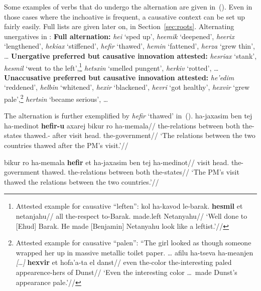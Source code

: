 Some examples of verbs that do undergo the alternation are given in~(\nextx). Even in those cases where the inchoative is frequent, a causative context can be set up fairly easily. Full lists are given later on, in Section~\ref{sec:roots}.
\pex\label{ex:thif-alt}Alternating unergatives in \thif:
	\a \textbf{Full alternation:} \emph{hei{\texttslig}} `sped up', \emph{heemik} `deepened', \emph{heerix} `lengthened', \emph{hekiax} `stiffened', \emph{hefir} `thawed', \emph{hemin} `fattened', \emph{herza} `grew thin', \dots
	\a \textbf{Unergative preferred but causative innovation attested:} \emph{hesriax} `stank', \emph{hesmil} `went to the left',\footnote{Attested example for causative ``leften'':
	\ex
		\begingl
		\gla kol ha-kavod le-barak. \textbf{hesmil} et netanjahu//
		\glb all the-respect to-Barak. made.left  Netanyahu//
		\glft `Well done to [Ehud] Barak. He made [Benjamin] Netanyahu look like a leftist.'//
		\endgl
	\xe
	} \emph{hetsxin} `smelled pungent', \emph{herkiv} `rotted', \dots
	\a \textbf{Unaccusative preferred but causative innovation attested:} \emph{he'edim} `reddened', \emph{helbin} `whitened', \emph{hexir} `blackened', \emph{hevri} `got healthy',
		\emph{hexvir} `grew pale',\footnote{Attested example for causative ``palen'':
		\ex ``The girl looked as though someone wrapped her up in massive metallic toilet paper. \dots
			\begingl
			\gla afilu ha-tseva ha-meanjen \emph{[}\dots\emph{]} \textbf{hexvir} et hofa'a-ta el danst//
			\glb even the-color the-interesting {} paled  appearence-hers of Dunst//
			\glft `Even the interesting color \dots~made Dunst's appearance pale.'//
			\endgl
		\xe
		} \emph{hertsin} `became serious', \dots
\xe

The alternation is further exemplified by \emph{hefir} `thawed' in~(\nextx).
\pex\label{ex:thif-hefSir}
	\a \begingl
		\gla ha-jaxasim ben tej ha-medinot \textbf{hefir-u} axarej bikur ro ha-memala//
		\glb the-relations between both the-states thawed.- after visit head. the-government//
		\glft `The relations between the two countries thawed after the PM's visit.'//
		\endgl
	
	\a \begingl
		\gla bikur ro ha-memala \textbf{hefir} et ha-jaxasim ben tej ha-medinot//
		\glb visit head. the-government thawed.  the-relations between both the-states//
		\glft `The PM's visit thawed the relations between the two countries.'//
		\endgl
\xe

